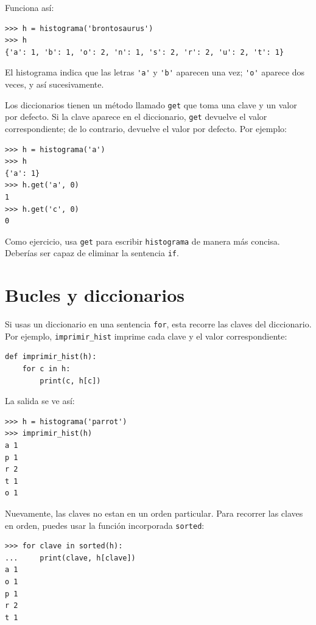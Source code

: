 \documentclass[10pt]{book}
\begin{document}
Funciona así:

\begin{verbatim}
>>> h = histograma('brontosaurus')
>>> h
{'a': 1, 'b': 1, 'o': 2, 'n': 1, 's': 2, 'r': 2, 'u': 2, 't': 1}
\end{verbatim}
%
El histograma indica que las letras \verb"'a'" y \verb"'b'"
aparecen una vez; \verb"'o'" aparece dos veces, y así sucesivamente.


Los diccionarios tienen un método llamado {\tt get} que toma una clave
y un valor por defecto.  Si la clave aparece en el diccionario,
{\tt get} devuelve el valor correspondiente; de lo contrario, devuelve
el valor por defecto.  Por ejemplo:

\begin{verbatim}
>>> h = histograma('a')
>>> h
{'a': 1}
>>> h.get('a', 0)
1
>>> h.get('c', 0)
0
\end{verbatim}
%
Como ejercicio, usa {\tt get} para escribir {\tt histograma} de manera más concisa.
Deberías ser capaz de eliminar la sentencia {\tt if}.


\section{Bucles y diccionarios}

Si usas un diccionario en una sentencia {\tt for}, esta recorre
las claves del diccionario.  Por ejemplo, \verb"imprimir_hist"
imprime cada clave y el valor correspondiente:

\begin{verbatim}
def imprimir_hist(h):
    for c in h:
        print(c, h[c])
\end{verbatim}
%
La salida se ve así:

\begin{verbatim}
>>> h = histograma('parrot')
>>> imprimir_hist(h)
a 1
p 1
r 2
t 1
o 1
\end{verbatim}
%
Nuevamente, las claves no estan en un orden particular.  Para recorrer las claves
en orden, puedes usar la función incorporada {\tt sorted}:

\begin{verbatim}
>>> for clave in sorted(h):
...     print(clave, h[clave])
a 1
o 1
p 1
r 2
t 1
\end{verbatim}

\end{document}
